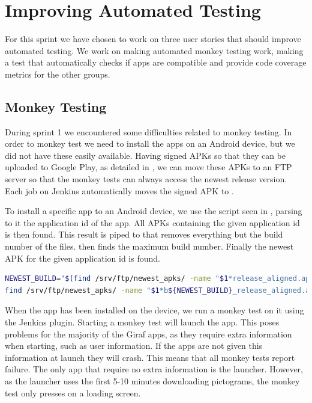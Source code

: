 \chapter{Improving Automated Testing}
For this sprint we have chosen to work on three user stories that should improve automated testing. We work on making automated monkey testing work, making a test that automatically checks if apps are compatible and provide code coverage metrics for the other groups.

\section{Monkey Testing}
During sprint 1 we encountered some difficulties related to monkey testing. In order to monkey test we need to install the apps on an Android device, but we did not have these easily available. Having signed APKs so that they can be uploaded to Google Play, as detailed in , we can move these APKs to an FTP server so that the monkey tests can always access the newest release version. Each job on Jenkins automatically moves the signed APK to .

To install a specific app to an Android device, we use the script seen in , parsing to it the application id of the app. All APKs containing the given application id is then found. This result is piped to  that removes everything but the build number of the files.  then finds the maximum build number. Finally the newest APK for the given application id is found.

\begin{lstlisting}[language=bash,showstringspaces=false,caption=Script that finds the newest build number for a particular application id,label=lst:find_newest_apk]
NEWEST_BUILD="$(find /srv/ftp/newest_apks/ -name "$1*release_aligned.apk" | sed 's|.*b||' | sed 's|_release_aligned.apk||' | awk '$0>x{x=$0};END{print x}')"
find /srv/ftp/newest_apks/ -name "$1*b${NEWEST_BUILD}_release_aligned.apk"
\end{lstlisting}

When the app has been installed on the device, we run a monkey test on it using the Jenkins plugin. Starting a monkey test will launch the app. This poses problems for the majority of the Giraf apps, as they require extra information when starting, such as user information. If the apps are not given this information at launch they will crash. This means that all monkey tests report failure. The only app that require no extra information is the launcher. However, as the launcher uses the first 5-10 minutes downloading pictograms, the monkey test only presses on a loading screen.

